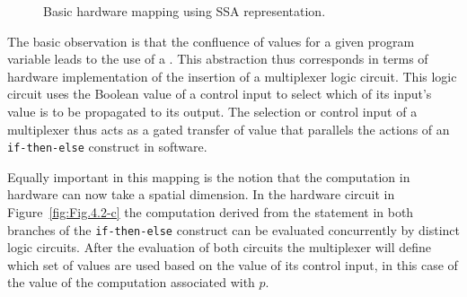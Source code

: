 \begin{figure}[htbp]
  \centering
\caption{Basic hardware mapping using SSA representation.}
\label{fig:Fig.4.2}
\end{figure}

The basic observation is that the confluence of values for a given program variable leads to the use of a \phifun. This \phifun abstraction thus corresponds in terms of hardware implementation of the insertion of a multiplexer logic circuit. This logic circuit uses the Boolean value of a control input to select which of its 
input's value is to be propagated to its output. The selection or control input of 
a multiplexer thus acts as a gated transfer of value that parallels the actions of 
an {\tt if-then-else} construct in software.

Equally important in this mapping is the notion that the computation in hardware can now take a spatial dimension.  In the hardware circuit in Figure~\ref{fig:Fig.4.2-c} the computation derived from the statement in both branches of the {\tt if-then-else} construct can be evaluated concurrently by distinct logic circuits.  After the evaluation of both circuits the multiplexer will define which set of values are used based on the value of its control input, in this case of the value of the computation associated with $p$.

